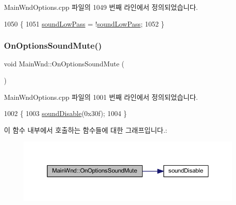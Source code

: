 Main\+Wnd\+Options.\+cpp 파일의 1049 번째 라인에서 정의되었습니다.


\begin{DoxyCode}
1050 \{
1051   \mbox{\hyperlink{gb_sound_8cpp_aec5149401826955810b6cdef5758badb}{soundLowPass}} = !\mbox{\hyperlink{gb_sound_8cpp_aec5149401826955810b6cdef5758badb}{soundLowPass}};
1052 \}
\end{DoxyCode}
\mbox{\label{class_main_wnd_affac8ac6a130bb9f388c6d4148ae1a0d}} 
\subsubsection{\texorpdfstring{On\+Options\+Sound\+Mute()}{OnOptionsSoundMute()}}
{\footnotesize\ttfamily void Main\+Wnd\+::\+On\+Options\+Sound\+Mute (\begin{DoxyParamCaption}{ }\end{DoxyParamCaption})\hspace{0.3cm}{\ttfamily [protected]}}



Main\+Wnd\+Options.\+cpp 파일의 1001 번째 라인에서 정의되었습니다.


\begin{DoxyCode}
1002 \{
1003   \mbox{\hyperlink{_sound_8cpp_ac659f56970310e671066599c629618b5}{soundDisable}}(0x30f);
1004 \}
\end{DoxyCode}
이 함수 내부에서 호출하는 함수들에 대한 그래프입니다.\+:
\nopagebreak
\begin{figure}[H]
\begin{center}
\leavevmode
\includegraphics[width=350pt]{class_main_wnd_affac8ac6a130bb9f388c6d4148ae1a0d_cgraph}
\end{center}
\end{figure}
\mbox{\label{class_main_wnd_a4d0172fc524e4d24d039ac5050acf160}} 
